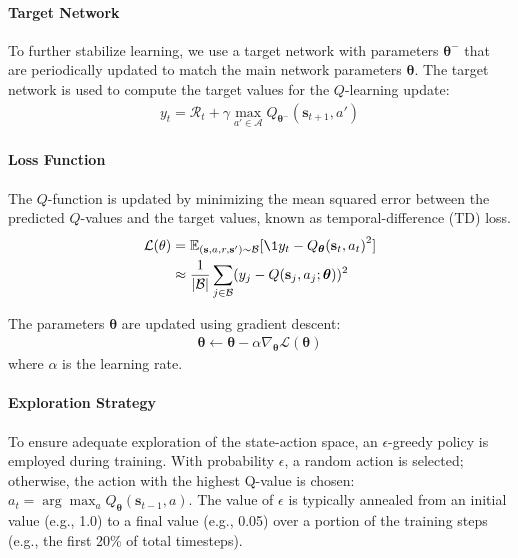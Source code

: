 \paragraph{Target Network}

To further stabilize learning, we use a target network with parameters $\boldsymbol{\theta}^-$ that are periodically updated to match the main network parameters $\boldsymbol{\theta}$. The target network is used to compute the target values for the $Q$-learning update:
\begin{align}
y_t = \mathcal R_t + \gamma \max_{a'\in \mathcal A} Q_{\boldsymbol{\theta}^-}(\mathbf s_{t+1}, a')
\end{align}


\paragraph{Loss Function}
The $Q$-function is updated by minimizing the mean squared error between the predicted $Q$-values and the target values, known as temporal-difference (TD) loss.
\begin{align*}
\mathcal{L}(\theta) 
&= \mathbb{E}_{(\mathbf s,a,r,\mathbf s')\sim \mathcal B} [\1{y_t - Q_{\boldsymbol{\theta}}(\mathbf s_t, a_t)}^2]
\\
&\approx  \frac{1}{|\mathcal{B}|}\sum_{j \in \mathcal{B}}(y_j - Q(\mathbf s_j, a_j;\boldsymbol{\theta}))^2
\end{align*}


The parameters $\boldsymbol{\theta}$ are updated using gradient descent:
\begin{align}
\boldsymbol{\theta} \leftarrow \boldsymbol{\theta} - \alpha \nabla_{\boldsymbol{\theta}}\mathcal{L}(\boldsymbol{\theta})
\end{align}
where $\alpha$ is the learning rate.


\paragraph{Exploration Strategy}

To ensure adequate exploration of the state-action space, an $\epsilon$-greedy policy is employed during training. With probability $\epsilon$, a random action is selected; otherwise, the action with the highest Q-value is chosen: $a_t = \arg\max_a Q_{\boldsymbol{\theta}}(\mathbf s_{t-1}, a)$. The value of $\epsilon$ is typically annealed from an initial value (e.g., 1.0) to a final value (e.g., 0.05) over a portion of the training steps (e.g., the first 20\% of total timesteps).

